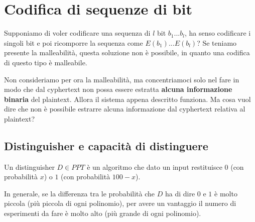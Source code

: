 \chapter{Codifica di sequenze di bit}
\label{chapter7}

Supponiamo di voler codificare una sequenza di $l$ bit $b_1 ... b_l$, ha senso codificare i singoli bit e poi ricomporre la sequenza come $E(b_1) ... E(b_l)$? Se teniamo presente la malleabilità, questa soluzione non è possibile, in quanto una codifica di questo tipo è malleabile. 

Non consideriamo per ora la malleabilità, ma concentriamoci solo nel fare in modo che dal cyphertext non possa essere estratta \textbf{alcuna informazione binaria} del plaintext. Allora il sistema appena descritto funziona. Ma cosa vuol dire che non è possibile estrarre alcuna informazione dal cyphertext relativa al plaintext?

\section{Distinguisher e capacità di distinguere}

\begin{definition}
Un distinguisher $D \in PPT$ è un algoritmo che dato un input restituisce $0$ (con probabilità $x$) o $1$ (con probabilità $100-x$).

In generale, se la differenza tra le probabilità che $D$ ha di dire $0$ e $1$ è molto piccola (più piccola di ogni polinomio), per avere un vantaggio il numero di esperimenti da fare è molto alto (più grande di ogni polinomio).\\
\end{definition}


